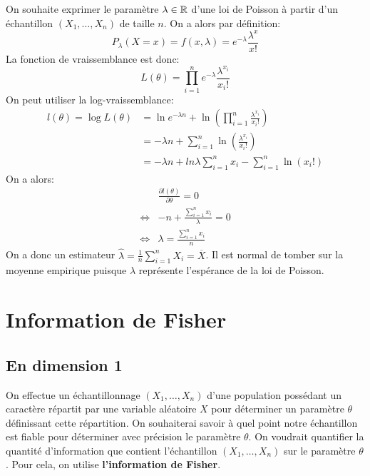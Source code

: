 \begin{example}
    On souhaite exprimer le paramètre $\lambda \in \mathbb{R}$ d'une loi de Poisson à partir d'un échantillon $(X_1, \dots, X_n)$ 
    de taille $n$. On a alors par définition: 
        \[ P_\lambda (X = x) = f(x,\lambda) = e^{- \lambda} \frac{\lambda^x}{x!} \] 
    La fonction de vraissemblance est donc: 
        \[ L(\theta) = \prod_{i=1}^{n} e^{- \lambda} \frac{\lambda^{x_i}}{x_i!} \] 
    On peut utiliser la log-vraissemblance: 
        \begin{align*}
            l(\theta) = \log L(\theta) &= \ln e^{- \lambda n} + \ln \left( \prod_{i=1}^{n} \frac{\lambda^{x_i}}{x_i!} \right) \\ 
            &= - \lambda n + \sum_{i=1}^{n} \ln \left( \frac{\lambda^{x_i}}{x_i !} \right) \\ 
            &= - \lambda n + ln \lambda \sum_{i=1}^{n} x_i - \sum_{i=1}^{n} \ln (x_i !)
        \end{align*}
    On a alors: 
        \begin{align*}
            & \frac{\partial l(\theta)}{\partial \theta} = 0 \\
            \iff & -n + \frac{\sum_{i=1}^{n} x_i}{\lambda} = 0 \\
            \iff & \lambda = \frac{\sum_{i=1}^{n} x_i}{n}
        \end{align*}
    On a donc un estimateur $\hat{\lambda} = \frac{1}{n} \sum_{i=1}^{n} X_i = \overline{X}$. 
    Il est normal de tomber sur la moyenne empirique puisque $\lambda$ représente l'espérance de la loi de Poisson. 
\end{example}


\section{Information de Fisher}

\subsection{En dimension 1}

On effectue un échantillonnage $(X_1, \dots, X_n)$ d'une population possédant un caractère répartit par une 
variable aléatoire $X$ pour déterminer un paramètre $\theta$ définissant cette répartition. 
On souhaiterai savoir à quel point notre échantillon est fiable pour déterminer avec précision le paramètre $\theta$. 
On voudrait quantifier la quantité d'information que contient l'échantillon $(X_1, \dots, X_n)$ sur le paramètre $\theta$. 
Pour cela, on utilise \textbf{l'information de Fisher}. 

